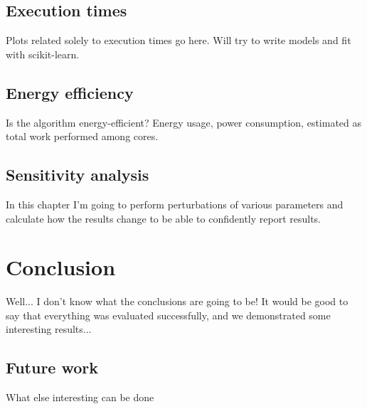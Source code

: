\documentclass[12pt,a4paper,twoside,openright]{report}
\begin{document}
\section{Execution times}
Plots related solely to execution times go here. Will try to write models and fit with scikit-learn.

\section{Energy efficiency}
Is the algorithm energy-efficient? Energy usage, power consumption, estimated as total work performed among cores.

\section{Sensitivity analysis}
In this chapter I'm going to perform perturbations of various parameters and calculate how the results change to be able to confidently report results.

\chapter{Conclusion}

Well... I don't know what the conclusions are going to be! It would be good to say that everything was evaluated successfully, and we demonstrated some interesting results... 

\section{Future work}
What else interesting can be done

\printbibliography

\appendix
\end{document}
